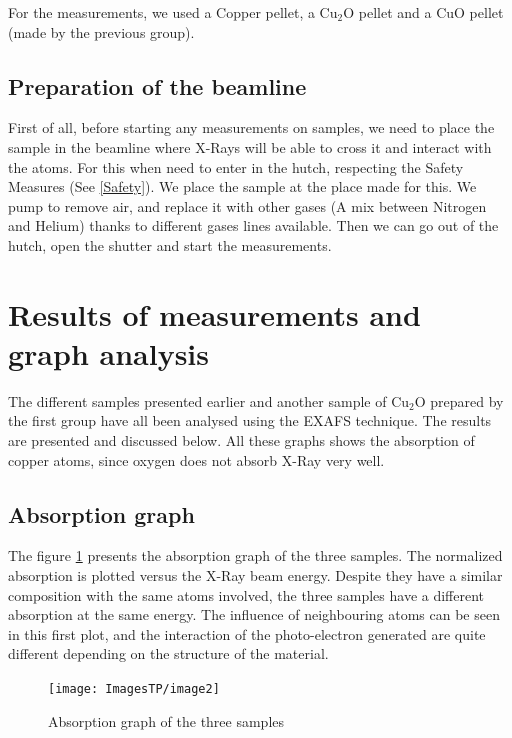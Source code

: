 \documentclass[11pt,a4paper,oneside]{report}
\begin{document}
For the measurements, we used a Copper pellet, a Cu$_2$O pellet and a CuO pellet (made by the previous group).

\subsection{Preparation of the beamline}

First of all, before starting any measurements on samples, we need to place the sample in the beamline where X-Rays will be able to cross it and interact with the atoms. For this when need to enter in the hutch, respecting the Safety Measures (See \ref{Safety}). We place the sample at the place made for this. We pump to remove air, and replace it with other gases (A mix between Nitrogen and Helium) thanks to different gases lines available. Then we can go out of the hutch, open the shutter and start the measurements.

\section{Results of measurements and graph analysis} \label{results}

The different samples presented earlier and another sample of Cu$_2$O prepared by the first group have all been analysed using the EXAFS technique. The results are presented and discussed below. All these graphs shows the absorption of copper atoms, since oxygen does not absorb X-Ray very well.

\subsection{Absorption graph}
The figure \ref{graph1} presents the absorption graph of the three samples. The normalized absorption is plotted versus the X-Ray beam energy. Despite they have a similar composition with the same atoms involved, the three samples have a different absorption at the same energy. The influence of neighbouring atoms can be seen in this first plot, and the interaction of the photo-electron generated are quite different depending on the structure of the material.
\begin{figure}[H]
    \begin{center}
        \texttt{[image: ImagesTP/image2]}
        \caption{Absorption graph of the three samples}
        \label{graph1}
    \end{center}
\end{figure}
\end{document}
